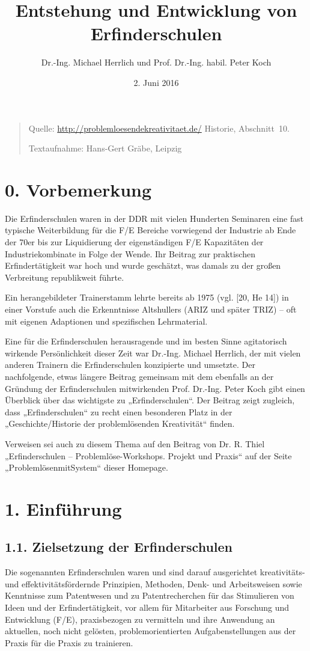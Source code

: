 \documentclass[11pt,a4paper]{article}
\title{Entstehung und Entwicklung von Erfinderschulen}
\author{Dr.-Ing. Michael Herrlich und Prof. Dr.-Ing. habil. Peter Koch}
\date{2. Juni 2016}
\begin{document}
\maketitle

\begin{quote}
  Quelle: \url{http://problemloesendekreativitaet.de/} Historie, Abschnitt~10.

  Textaufnahme: Hans-Gert Gräbe, Leipzig
\end{quote}

\section*{0. Vorbemerkung}

Die Erfinderschulen waren in der DDR mit vielen Hunderten Seminaren eine fast
typische Weiterbildung für die F/E Bereiche vorwiegend der Industrie ab Ende
der 70er bis zur Liquidierung der eigenständigen F/E Kapazitäten der
Industriekombinate in Folge der Wende. Ihr Beitrag zur praktischen
Erfindertätigkeit war hoch und wurde geschätzt, was damals zu der großen
Verbreitung republikweit führte. 

Ein herangebildeter Trainerstamm lehrte bereits ab 1975 (vgl. [20, He 14]) in
einer Vorstufe auch die Erkenntnisse Altshullers (ARIZ und später TRIZ) – oft
mit eigenen Adaptionen und spezifischen Lehrmaterial.

Eine für die Erfinderschulen herausragende und im besten Sinne agitatorisch
wirkende Per\-sön\-lich\-keit dieser Zeit war Dr.-Ing. Michael Herrlich, der
mit vielen anderen Trainern die Erfinderschulen konzipierte und umsetzte. Der
nachfolgende, etwas längere Beitrag gemeinsam mit dem ebenfalls an der
Gründung der Erfinderschulen mitwirkenden Prof. Dr.-Ing. Peter Koch gibt einen
Überblick über das wichtigste zu „Erfinderschulen“. Der Beitrag zeigt
zugleich, dass „Erfinderschulen“ zu recht einen besonderen Platz in der
„Geschichte/Historie der problemlösenden Kreativität“ finden.

Verweisen sei auch zu diesem Thema auf den Beitrag von Dr. R. Thiel
„Erfinderschulen -- Problemlöse-Workshops. Projekt und Praxis“ auf der Seite
„ProblemlösenmitSystem“ dieser Homepage.

\section*{1. Einführung}

\subsection*{1.1. Zielsetzung der Erfinderschulen}
Die sogenannten Erfinderschulen waren und sind darauf ausgerichtet
kreativitäts- und effektivitätsfördernde Prinzipien, Methoden, Denk- und
Arbeitsweisen sowie Kenntnisse zum Patentwesen und zu Patentrecherchen für
das Stimulieren von Ideen und der Erfindertätigkeit, vor allem für Mitarbeiter
aus Forschung und Entwicklung (F/E), praxisbezogen zu vermitteln und ihre
Anwendung an aktuellen, noch nicht gelösten, problemorientierten
Aufgabenstellungen aus der Praxis für die Praxis zu trainieren.
\end{document}

